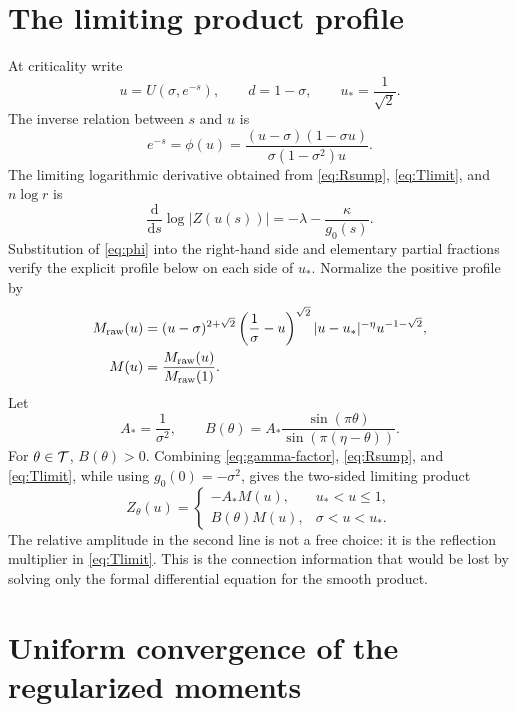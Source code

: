 \documentclass[11pt]{article}
\theoremstyle{definition}
\theoremstyle{remark}
\newcommand{\dd}{\mathrm d}
\begin{document}
\section{The limiting product profile}\label{sec:profile}

At criticality write
\[
  u=U(\sigma,e^{-s}),\qquad d=1-\sigma,\qquad
  u_*=\frac1{\sqrt2}.
\]
The inverse relation between \(s\) and \(u\) is
\begin{equation}\label{eq:phi}
  e^{-s}=\phi(u)
  =\frac{(u-\sigma)(1-\sigma u)}
         {\sigma(1-\sigma^2)u}.
\end{equation}
The limiting logarithmic derivative obtained from
\eqref{eq:Rsump}, \eqref{eq:Tlimit}, and \(n\log r\) is
\begin{equation}\label{eq:profile-ode}
 \frac{\dd}{\dd s}\log|Z(u(s))|
 =-\lambda-\frac{\kappa}{g_0(s)}.
\end{equation}
Substitution of \eqref{eq:phi} into the right-hand side and elementary
partial fractions verify the explicit profile below on each side of \(u_*\).
Normalize the positive profile by
\[
\begin{aligned}
 M_{\rm raw}(u)
  &=(u-\sigma)^{2+\sqrt2}
    \left(\frac1\sigma-u\right)^{\sqrt2}
    |u-u_*|^{-\eta}u^{-1-\sqrt2},\\
 M(u)&=\frac{M_{\rm raw}(u)}{M_{\rm raw}(1)}.
\end{aligned}
\]
Let
\[
  A_*=\frac1{\sigma^2},\qquad
  B(\theta)=A_*
   \frac{\sin(\pi\theta)}{\sin(\pi(\eta-\theta))}.
\]
For \(\theta\in{\cal T}\), \(B(\theta)>0\).  Combining
\eqref{eq:gamma-factor}, \eqref{eq:Rsump}, and \eqref{eq:Tlimit}, while
using \(g_0(0)=-\sigma^2\), gives the two-sided limiting product
\begin{equation}\label{eq:profile}
 Z_\theta(u)=
 \begin{cases}
  -A_*M(u),&u_*<u\leq1,\\
  B(\theta)M(u),&\sigma<u<u_*.
 \end{cases}
\end{equation}
The relative amplitude in the second line is not a free choice: it is the
reflection multiplier in \eqref{eq:Tlimit}.  This is the connection
information that would be lost by solving only the formal differential
equation for the smooth product.

\section{Uniform convergence of the regularized moments}\label{sec:moments}
\end{document}
